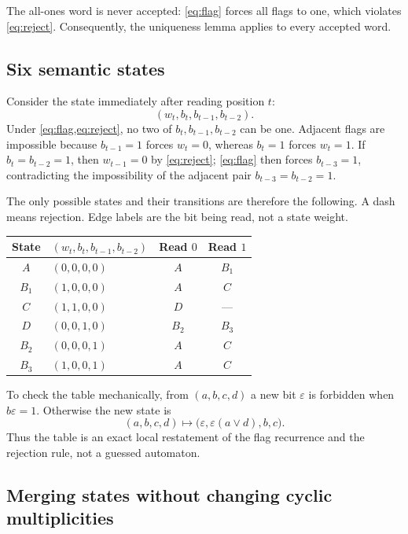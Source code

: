 \documentclass[11pt,a4paper]{article}
\theoremstyle{definition}
\newcommand{\eps}{\varepsilon}
\begin{document}
The all-ones word is never accepted: \cref{eq:flag} forces all flags to one,
which violates \cref{eq:reject}. Consequently, the uniqueness lemma applies
to every accepted word.

\subsection{Six semantic states}

Consider the state immediately after reading position $t$:
\[
 (w_t,b_t,b_{t-1},b_{t-2}).
\]
Under \cref{eq:flag,eq:reject}, no two of $b_t,b_{t-1},b_{t-2}$ can be one.
Adjacent flags are impossible because $b_{t-1}=1$ forces $w_t=0$, whereas
$b_t=1$ forces $w_t=1$. If $b_t=b_{t-2}=1$, then $w_{t-1}=0$ by
\cref{eq:reject}; \cref{eq:flag} then forces $b_{t-3}=1$, contradicting
the impossibility of the adjacent pair $b_{t-3}=b_{t-2}=1$.

The only possible states and their transitions are therefore the following.
A dash means rejection. Edge labels are the bit being read, not a state
weight.
\begin{center}
\begin{tabular}{@{}clcc@{}}
\toprule
State & $(w_t,b_t,b_{t-1},b_{t-2})$ & Read $0$ & Read $1$\\
\midrule
$A$   & $(0,0,0,0)$ & $A$ & $B_1$\\
$B_1$ & $(1,0,0,0)$ & $A$ & $C$\\
$C$   & $(1,1,0,0)$ & $D$ & ---\\
$D$   & $(0,0,1,0)$ & $B_2$ & $B_3$\\
$B_2$ & $(0,0,0,1)$ & $A$ & $C$\\
$B_3$ & $(1,0,0,1)$ & $A$ & $C$\\
\bottomrule
\end{tabular}
\end{center}

To check the table mechanically, from $(a,b,c,d)$ a new bit $\eps$ is
forbidden when $b\eps=1$. Otherwise the new state is
\begin{equation}
 (a,b,c,d)\longmapsto
 \bigl(\eps,\eps(a\lor d),b,c\bigr).
 \label{eq:sixtransition}
\end{equation}
Thus the table is an exact local restatement of the flag recurrence and the
rejection rule, not a guessed automaton.

\subsection{Merging states without changing cyclic multiplicities}
\end{document}
